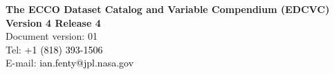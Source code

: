 \pagebreak
\begin{center}
    \vspace*{2cm}
    {\Large \textbf{The ECCO Dataset Catalog and Variable Compendium (EDCVC)}}\\[3cm]
    {\LARGE \textbf{Version 4 Release 4}}\\[2.5cm]
    {\Large Document version: 01}\\[4cm]
    {\large Tel: \textcolor{black}{+1 (818) 393-1506}\\[.5cm]
    E-mail: \textcolor{black}{ian.fenty@jpl.nasa.gov}}\\[2cm]
\end{center}


\newpage




